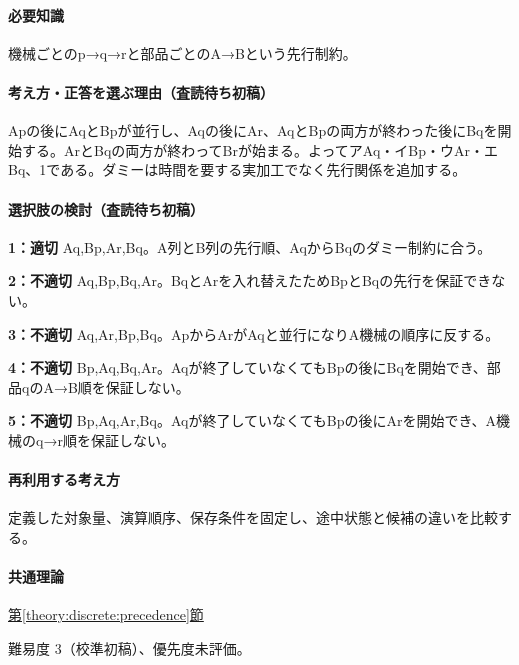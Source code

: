 \paragraph{必要知識} 機械ごとのp→q→rと部品ごとのA→Bという先行制約。

\paragraph{考え方・正答を選ぶ理由（査読待ち初稿）} Apの後にAqとBpが並行し、Aqの後にAr、AqとBpの両方が終わった後にBqを開始する。ArとBqの両方が終わってBrが始まる。よってアAq・イBp・ウAr・エBq、1である。ダミーは時間を要する実加工でなく先行関係を追加する。

\paragraph{選択肢の検討（査読待ち初稿）}\mbox{}\par

\noindent\textbf{1：適切} Aq,Bp,Ar,Bq。A列とB列の先行順、AqからBqのダミー制約に合う。\par

\noindent\textbf{2：不適切} Aq,Bp,Bq,Ar。BqとArを入れ替えたためBpとBqの先行を保証できない。\par

\noindent\textbf{3：不適切} Aq,Ar,Bp,Bq。ApからArがAqと並行になりA機械の順序に反する。\par

\noindent\textbf{4：不適切} Bp,Aq,Bq,Ar。Aqが終了していなくてもBpの後にBqを開始でき、部品qのA→B順を保証しない。\par

\noindent\textbf{5：不適切} Bp,Aq,Ar,Bq。Aqが終了していなくてもBpの後にArを開始でき、A機械のq→r順を保証しない。\par

\paragraph{再利用する考え方} 定義した対象量、演算順序、保存条件を固定し、途中状態と候補の違いを比較する。

\paragraph{共通理論} \hyperref[theory:discrete:precedence]{第\ref*{theory:discrete:precedence}節}

\par 難易度 3（校準初稿）、優先度未評価。

